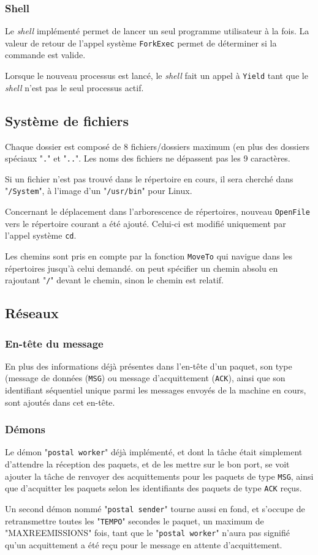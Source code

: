 \documentclass{article}
\begin{document}
{			\subsubsection{Shell}
			{Le \emph{shell} implémenté permet de lancer un seul programme utilisateur à la fois. La valeur de retour de l'appel système \texttt{ForkExec} permet de déterminer si la commande est valide.}
			~\par{Lorsque le nouveau processus est lancé, le \emph{shell} fait un appel à \texttt{Yield} tant que le \emph{shell} n'est pas le seul processus actif.}


	\subsection{Système de fichiers}
		{Chaque dossier est composé de 8 fichiers/dossiers maximum (en plus des dossiers spéciaux "\texttt{.}" et "\texttt{..}". Les noms des fichiers ne dépassent pas les 9 caractères.}
		~\par{Si un fichier n'est pas trouvé dans le répertoire en cours, il sera cherché dans "\texttt{/System}", à l'image d'un "\texttt{/usr/bin}" pour Linux.}
		~\par{Concernant le déplacement dans l'arborescence de répertoires, nouveau \texttt{OpenFile} vers le répertoire courant a été ajouté. Celui-ci est modifié uniquement par l'appel système \texttt{cd}.}
		~\par{Les chemins sont pris en compte par la fonction \texttt{MoveTo} qui navigue dans les répertoires jusqu'à celui demandé. on peut spécifier un chemin absolu en rajoutant "\texttt{/}" devant le chemin, sinon le chemin est relatif.}
		
		
	\subsection{Réseaux}
		\subsubsection{En-tête du message}
			{En plus des informations déjà présentes dans l'en-tête d'un paquet, son type (message de données (\texttt{MSG}) ou message d'acquittement (\texttt{ACK}), ainsi que son identifiant séquentiel unique parmi les messages envoyés de la machine en cours, sont ajoutés dans cet en-tête.}
		\subsubsection{Démons}
			{Le démon "\texttt{postal worker}" déjà implémenté, et dont la tâche était simplement d'attendre la réception des paquets, et de les mettre sur le bon port, se voit ajouter la tâche de renvoyer des acquittements pour les paquets de type \texttt{MSG}, ainsi que d'acquitter les paquets selon les identifiants des paquets de type \texttt{ACK} reçus.}
			~\par{Un second démon nommé "\texttt{postal sender}" tourne aussi en fond, et s'occupe de retransmettre toutes les "\texttt{TEMPO}" secondes le paquet, un maximum de "{MAXREEMISSIONS}" fois, tant que le "\texttt{postal worker}" n'aura pas signifié qu'un acquittement a été reçu pour le message en attente d'acquittement.}
}
\end{document}
